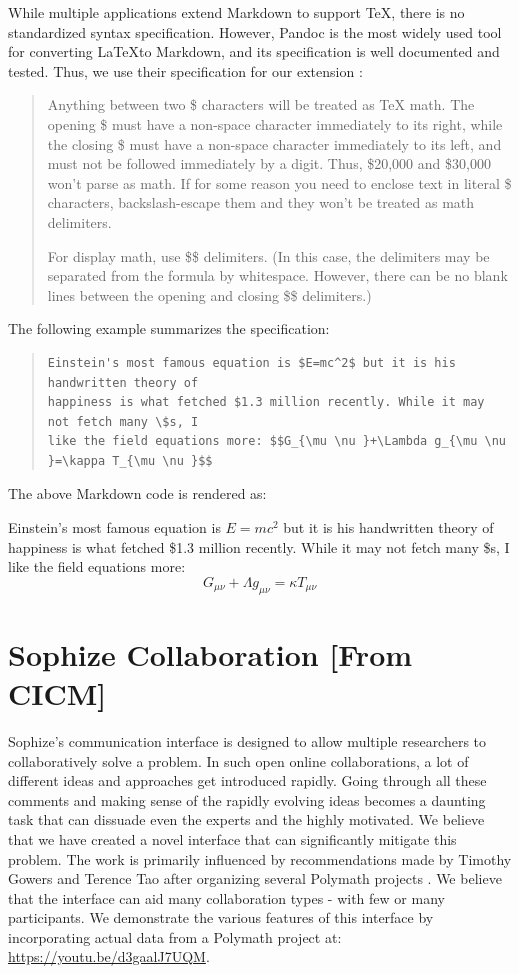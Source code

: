 \documentclass[a4paper]{article}
\begin{document}
While multiple applications extend Markdown to support TeX, there is no standardized syntax specification. However, Pandoc is the most widely used tool for converting \LaTeX\space to Markdown, and its specification is well documented and tested. Thus, we use their specification for our extension \cite{pandoc}:

\blockquote{Anything between two \$ characters will be treated as TeX math. The opening \$ must have a non-space character immediately to its right, while the closing \$ must have a non-space character immediately to its left, and must not be followed immediately by a digit. Thus, \$20,000 and \$30,000 won’t parse as math. If for some reason you need to enclose text in literal \$ characters, backslash-escape them and they won’t be treated as math delimiters.

For display math, use \$\$ delimiters. (In this case, the delimiters may be separated from the formula by whitespace. However, there can be no blank lines between the opening and closing \$\$ delimiters.)}

The following example summarizes the specification:
\begin{quote}
\begin{verbatim} 
Einstein's most famous equation is $E=mc^2$ but it is his handwritten theory of 
happiness is what fetched $1.3 million recently. While it may not fetch many \$s, I 
like the field equations more: $$G_{\mu \nu }+\Lambda g_{\mu \nu }=\kappa T_{\mu \nu }$$
\end{verbatim}
\end{quote}


The above Markdown code is rendered as:
\begin{mdframed}
Einstein's most famous equation is $E=mc^2$ but it is his handwritten theory of happiness is
what fetched \$1.3 million recently. While it may not fetch many \$s, I like the field
equations more: $$G_{\mu \nu }+\Lambda g_{\mu \nu }=\kappa T_{\mu \nu }$$
\end{mdframed}

\section{Sophize Collaboration [From CICM]}

Sophize's communication interface is designed to allow multiple researchers to collaboratively solve a problem. In such open online collaborations, a lot of different ideas and approaches get introduced rapidly. Going through all these comments and making sense of the rapidly evolving ideas becomes a daunting task that can dissuade even the experts and the highly motivated. We believe that we have created a novel interface that can significantly mitigate this problem. The work is primarily influenced by recommendations made by Timothy Gowers and Terence Tao after organizing several Polymath projects \cite{polymath_blog}. We believe that the interface can aid many collaboration types - with few or many participants. We demonstrate the various features of this interface by incorporating actual data from a Polymath project at: \url{https://youtu.be/d3gaalJ7UQM}.
\end{document}
